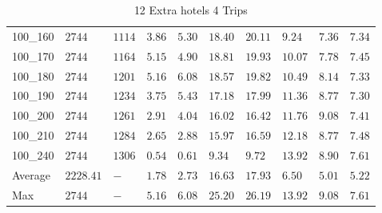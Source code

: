 \begin{center}
\begin{table}[]
\begin{adjustwidth}{-0.4in}{-1in}
\begin{tabular}{|lll|l|l|ll|lll|}
100\_160 & $2744   $   & $1114$ & $3.86$ & $5.30$   & $18.40$    & $20.11$   & $9.24 $& $7.36$   & $7.34 $ \\
100\_170 & $2744   $   & $1164$ & $5.15$ & $4.90$   & $18.81$    & $19.93$   & $10.07$& $7.78$   & $7.45 $ \\
100\_180 & $2744   $   & $1201$ & $5.16$ & $6.08$   & $18.57$    & $19.82$   & $10.49$& $8.14$   & $7.33 $ \\
100\_190 & $2744   $   & $1234$ & $3.75$ & $5.43$   & $17.18$    & $17.99$   & $11.36$& $8.77$   & $7.30 $ \\
100\_200 & $2744   $   & $1261$ & $2.91$ & $4.04$   & $16.02$    & $16.42$   & $11.76$& $9.08$   & $7.41 $ \\
100\_210 & $2744   $   & $1284$ & $2.65$ & $2.88$   & $15.97$    & $16.59$   & $12.18$& $8.77$   & $7.48 $ \\
100\_240 & $2744   $   & $1306$ & $0.54$ & $0.61$   & $9.34$    & $9.72$   & $13.92$& $8.90$   & $7.61 $ \\
\hline
Average  & $2228.41$   & $-   $ & $1.78$ & $2.73$   & $16.63$    & $17.93$   & $6.50 $& $5.01$   & $5.22 $ \\
Max      & $2744   $   & $-   $ & $5.16$ & $6.08$   & $25.20$    & $26.19$   & $13.92$& $9.08$   & $7.61 $ \\
\hline
\end{tabular}
    \end{adjustwidth}
    \caption{12 Extra hotels 4 Trips}
    \label{12-4}
    \end{table}
\end{center}
